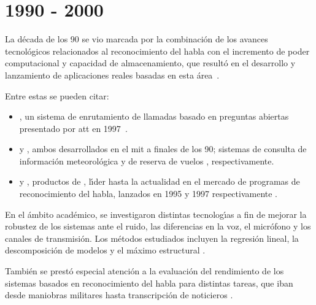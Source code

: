\section{1990 - 2000}
\label{sec:90s}

La d\'ecada de los 90 se vio marcada por la combinaci\'on de los avances tecnol\'ogicos relacionados al 
reconocimiento del habla con el incremento de poder computacional y capacidad de almacenamiento, 
que result\'o en el desarrollo y
lanzamiento de aplicaciones reales basadas en esta \mbox{\'area \cite{JuangAutomaticSpeech, GauvainLarge2000}}.

Entre estas se pueden citar:
\begin{itemize}
\item {}, un sistema de enrutamiento de llamadas basado en preguntas abiertas 
presentado por \gls{att} en \mbox{1997 \cite{Sachs97howmay}}. 

\item {} y , ambos desarrollados en el \gls{mit} a finales de los 90;
sistemas de consulta de informaci\'on meteorol\'ogica \cite{ZueJupiter2000} y  de reserva de vuelos 
\cite{Seneff2000Dialogue}, respectivamente.

\item {} y , productos de 
, l{\'\i}der hasta la actualidad en el mercado de programas de reconocimiento del 
habla, lanzados en 1995 y 1997 respectivamente \cite{BarnettMultilingual1996, BlandingSpeechless2012}.
\end{itemize}

En el \'ambito acad\'emico, se investigaron distintas tecnolog{\'\i}as a fin de mejorar la robustez de los
sistemas ante el ruido, las diferencias en la voz, el micr\'ofono y los canales de transmisi\'on. 
Los m\'etodos estudiados incluyen la regresi\'on lineal, la descomposici\'on de modelos y el m\'aximo
estructural  \cite{AnusuyaSpeech2009}.

Tambi\'en se prest\'o especial atenci\'on a la evaluaci\'on del rendimiento de los sistemas basados en
reconocimiento del habla para distintas tareas, que iban desde maniobras militares hasta transcripci\'on 
de noticieros \cite{JuangAutomaticSpeech}.